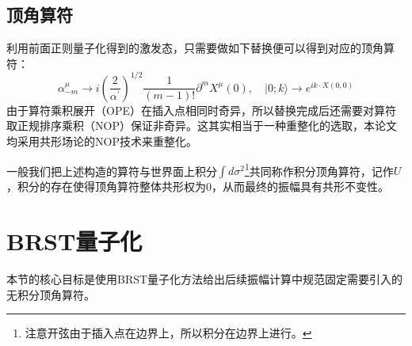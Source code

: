 \subsection{顶角算符}
利用前面正则量子化得到的激发态，只需要做如下替换便可以得到对应的顶角算符：
\begin{equation}
	\alpha_{-m}^\mu\to i\left(\frac{2}{\alpha^{\prime}}\right)^{1/2}\frac{1}{(m-1)!}\partial^mX^\mu(0),\quad
	|0;k\rangle\rightarrow e^{ik\cdot X(0,0)}
\end{equation}
由于算符乘积展开（OPE）在插入点相同时奇异，所以替换完成后还需要对算符取正规排序乘积（NOP）保证非奇异。这其实相当于一种重整化的选取，本论文均采用共形场论的NOP技术来重整化。

一般我们把上述构造的算符与世界面上积分$\int d\sigma^2$\footnote{注意开弦由于插入点在边界上，所以积分在边界上进行。}共同称作积分顶角算符，记作$U$，积分的存在使得顶角算符整体共形权为$0$，从而最终的振幅具有共形不变性。
\section{BRST量子化}
本节的核心目标是使用BRST量子化方法给出后续振幅计算中规范固定需要引入的无积分顶角算符。

